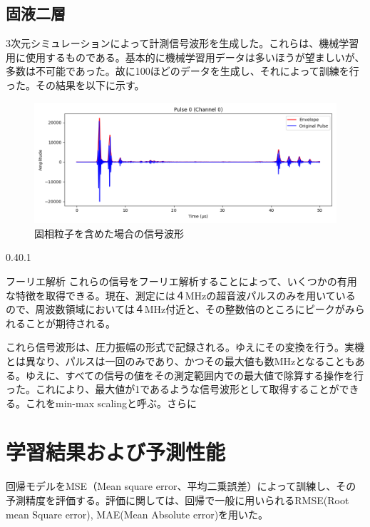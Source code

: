 \documentclass[uplatex]{suribt}
\makeatletter
\renewcommand{\subsection}{%
    \@startsection{subsection}{1}{\z@}%
    {0.4\Cvs}{0.1\Cvs}%
    {\normalfont\normalsize\headfont\raggedright}}
\makeatother
\begin{document}
\section{固液二層}
3次元シミュレーションによって計測信号波形を生成した。これらは、機械学習用に使用するものである。基本的に機械学習用データは多いほうが望ましいが、多数は不可能であった。故に100ほどのデータを生成し、それによって訓練を行った。その結果を以下に示す。
\begin{figure}[htbp]
    \centering
    \includegraphics[width=0.5\linewidth]{pictures/results/solid_liquid7_processed_0pulse.png}
    \caption{固相粒子を含めた場合の信号波形}
    \label{fig:solid_liquid}
\end{figure}

\subsection{フーリエ解析}
これらの信号をフーリエ解析することによって、いくつかの有用な特徴を取得できる。現在、測定には４MHzの超音波パルスのみを用いているので、周波数領域においては４MHz付近と、その整数倍のところにピークがみられることが期待される。

これら信号波形は、圧力振幅の形式で記録される。ゆえにその変換を行う。実機とは異なり、パルスは一回のみであり、かつその最大値も数MHzとなることもある。ゆえに、すべての信号の値をその測定範囲内での最大値で除算する操作を行った。これにより、最大値が1であるような信号波形として取得することができる。これをmin-max scalingと呼ぶ。さらに
\chapter{学習結果および予測性能}
回帰モデルをMSE（Mean square error、平均二乗誤差）によって訓練し、その予測精度を評価する。評価に関しては、回帰で一般に用いられるRMSE(Root mean Square error), MAE(Mean Absolute error)を用いた。
\end{document}
